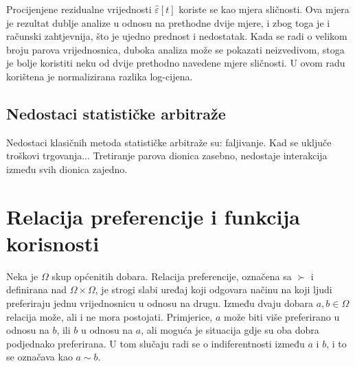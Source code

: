 \documentclass[lmodern, utf8, diplomski, numeric]{fer}
\begin{document}
  Procijenjene rezidualne vrijednosti $\hat{\varepsilon}\left[t\right]$ koriste se kao mjera sličnosti.
  Ova mjera je rezultat dublje analize u odnosu na prethodne dvije mjere, i zbog toga je i računski zahtjevnija, što je ujedno prednost i nedostatak.
  Kada se radi o velikom broju parova vrijednosnica, duboka analiza može se pokazati neizvedivom, stoga je bolje koristiti neku od dvije prethodno navedene mjere sličnosti.
  U ovom radu korištena je normalizirana razlika log-cijena.
  
  \subsection{Nedostaci statističke arbitraže}
  
  Nedostaci klasičnih metoda statističke arbitraže su: faljivanje. Kad se uključe troškovi trgovanja...
  Tretiranje parova dionica zasebno, nedostaje interakcija između svih dionica zajedno.

  \section{Relacija preferencije i funkcija korisnosti}

  Neka je $\Omega$ skup općenitih dobara.
  Relacija preferencije, označena sa $\succ$ i definirana nad $\Omega \times \Omega$, je strogi slabi uređaj koji odgovara načinu na koji ljudi preferiraju jednu vrijednosnicu u odnosu na drugu.
  Između dvaju dobara $a, b \in \Omega$ relacija može, ali i ne mora postojati.
  Primjerice, $a$ može biti više preferirano u odnosu na $b$, ili $b$ u odnosu na $a$, ali moguća je situacija gdje su oba dobra podjednako preferirana.
  U tom slučaju radi se o indiferentnosti između $a$ i $b$, i to se označava kao $a \sim b$.
\end{document}

